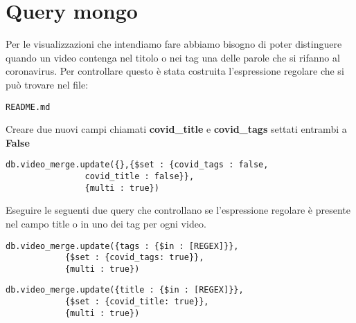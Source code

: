 \documentclass[10pt, a4paper,openany]{article}
\begin{document}
\section*{Query mongo}


Per le visualizzazioni che intendiamo fare abbiamo bisogno di poter distinguere quando un video contenga nel titolo o nei tag una delle parole che si rifanno al coronavirus. Per controllare questo è stata costruita l'espressione regolare che si può trovare nel file:
\begin{verbatim}
README.md
\end{verbatim} 





Creare due nuovi campi chiamati \textbf{covid\_title} e \textbf{covid\_tags} settati entrambi a \textbf{False} 

\begin{Verbatim}[frame=single,baselinestretch=0.1]
db.video_merge.update({},{$set : {covid_tags : false, 
				covid_title : false}},
				{multi : true})
\end{Verbatim}
Eseguire le seguenti due query che controllano se l'espressione regolare è presente nel campo title o in uno dei tag per ogni video.

\begin{Verbatim}[frame=single,baselinestretch=0.1]
db.video_merge.update({tags : {$in : [REGEX]}}, 
			{$set : {covid_tags: true}}, 
			{multi : true})
\end{Verbatim}
 \begin{Verbatim}[frame=single,baselinestretch=0.1]
db.video_merge.update({title : {$in : [REGEX]}}, 
			{$set : {covid_title: true}}, 
			{multi : true})
\end{Verbatim}
\end{document}
